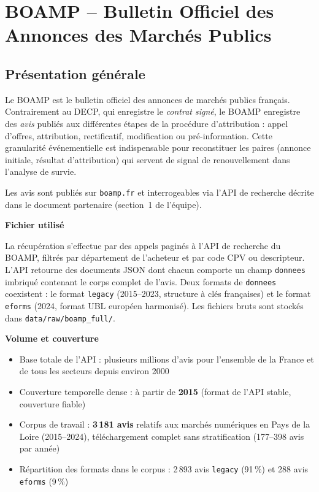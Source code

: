 \documentclass[12pt,a4paper]{article}
\begin{document}
\section{BOAMP -- Bulletin Officiel des Annonces des Marchés Publics}

\subsection{Présentation générale}

Le BOAMP est le bulletin officiel des annonces de marchés publics français.
Contrairement au DECP, qui enregistre le \emph{contrat signé}, le BOAMP
enregistre des \emph{avis} publiés aux différentes étapes de la procédure
d'attribution : appel d'offres, attribution, rectificatif, modification ou
pré-information. Cette granularité événementielle est indispensable pour
reconstituer les paires (annonce initiale, résultat d'attribution) qui
servent de signal de renouvellement dans l'analyse de survie.

Les avis sont publiés sur \texttt{boamp.fr} et interrogeables via l'API de
recherche décrite dans le document partenaire (section~1 de l'équipe).

\medskip
\textbf{Fichier utilisé}

La récupération s'effectue par des appels paginés à l'API de recherche du
BOAMP, filtrés par département de l'acheteur et par code CPV ou descripteur.
L'API retourne des documents JSON dont chacun comporte un champ
\texttt{donnees} imbriqué contenant le corps complet de l'avis.
Deux formats de \texttt{donnees} coexistent : le format \texttt{legacy}
(2015--2023, structure à clés françaises) et le format \texttt{eforms}
(2024, format UBL européen harmonisé). Les fichiers bruts sont stockés dans
\texttt{data/raw/boamp\_full/}.

\medskip
\textbf{Volume et couverture}

\begin{itemize}
  \item[---] Base totale de l'API : plusieurs millions d'avis pour l'ensemble
    de la France et de tous les secteurs depuis environ 2000
  \item[---] Couverture temporelle dense : à partir de \textbf{2015}
    (format de l'API stable, couverture fiable)
  \item[---] Corpus de travail : \textbf{3\,181 avis} relatifs aux marchés
    numériques en Pays de la Loire (2015--2024), téléchargement complet
    sans stratification (177--398 avis par année)
  \item[---] Répartition des formats dans le corpus : 2\,893 avis
    \texttt{legacy} (91\,\%) et 288 avis \texttt{eforms} (9\,\%)
\end{itemize}
\end{document}
